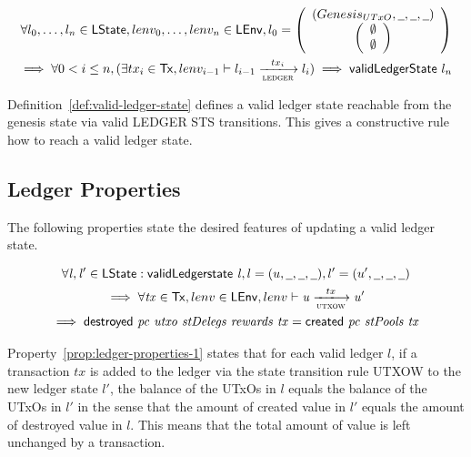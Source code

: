\begin{definition}
  \begin{multline*}
    \forall l_{0},\ldots,l_{n} \in \LState, lenv_{0},\ldots,lenv_{n} \in \LEnv,
    l_{0} = \left(
      \begin{array}{c}
        \genesisUTxOState \\
        \left(
        \begin{array}{c}
          \emptyset\\
          \emptyset
        \end{array}
        \right)
      \end{array}
    \right)  \\
    \implies \forall 0 < i \leq n, (\exists tx_{i} \in \Tx,
    lenv_{i-1}\vdash l_{i-1} \trans{ledger}{tx_{i}} l_{i}) \implies
    \applyFun{validLedgerState} l_{n}
  \end{multline*}
  \label{def:valid-ledger-state}
\end{definition}

Definition~\ref{def:valid-ledger-state} defines a valid ledger state reachable
from the genesis state via valid LEDGER STS transitions. This gives a
constructive rule how to reach a valid ledger state.

\subsection{Ledger Properties}
\label{sec:ledger-properties}

The following properties state the desired features of updating a valid ledger
state.

\begin{property}
  \begin{multline*}
    \forall \var{l}, \var{l'} \in \LState: \applyFun{validLedgerstate}{l},
    l=(u,\wcard,\wcard,\wcard), l' = (u',\wcard,\wcard,\wcard)\\
    \implies \forall \var{tx} \in \Tx, lenv \in\LEnv, lenv \vdash\var{u} \trans{utxow}{tx} \var{u'} \\
    \implies \applyFun{destroyed}{pc~utxo~stDelegs~rewards~tx} =
    \applyFun{created}{pc~stPools~tx}
  \end{multline*}
  \label{prop:ledger-properties-1}
\end{property}

Property~\ref{prop:ledger-properties-1} states that for each valid ledger $l$,
if a transaction $tx$ is added to the ledger via the state transition rule UTXOW
to the new ledger state $l'$, the balance of the UTxOs in $l$ equals the balance
of the UTxOs in $l'$ in the sense that the amount of created value in $l'$
equals the amount of destroyed value in $l$. This means that the total amount of
value is left unchanged by a transaction.

